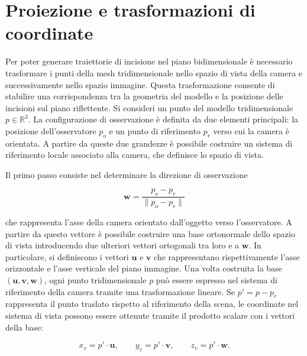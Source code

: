 \documentclass[a4paper,11pt,titlepage,twoside]{book}
\newcommand{\1}{\mathbf{1}}
\numberwithin{equation}{chapter}
\theoremstyle{plain}
\theoremstyle{definition}
\begin{document}
	\section{Proiezione e trasformazioni di coordinate}
	
	Per poter generare traiettorie di incisione nel piano bidimensionale è necessario trasformare i punti della mesh tridimensionale nello spazio di vista della camera e successivamente nello spazio immagine. Questa trasformazione consente di stabilire una corrispondenza tra la geometria del modello e la posizione delle incisioni sul piano riflettente.
	Si consideri un punto del modello tridimensionale \(p \in \mathbb{R}^3\). La configurazione di osservazione è definita da due elementi principali: la posizione dell’osservatore \(p_o\) e un punto di riferimento \(p_r\) verso cui la camera è orientata. A partire da queste due grandezze è possibile costruire un sistema di riferimento locale associato alla camera, che definisce lo spazio di vista.
	
	Il primo passo consiste nel determinare la direzione di osservazione
	
	\[
	\mathbf{w} = \frac{p_o - p_r}{\|p_o - p_r\|}
	\]
	
	che rappresenta l’asse della camera orientato dall’oggetto verso l’osservatore. A partire da questo vettore è possibile costruire una base ortonormale dello spazio di vista introducendo due ulteriori vettori ortogonali tra loro e a \(\mathbf{w}\). In particolare, si definiscono i vettori \(\mathbf{u}\) e \(\mathbf{v}\) che rappresentano rispettivamente l’asse orizzontale e l’asse verticale del piano immagine.
	Una volta costruita la base \((\mathbf{u}, \mathbf{v}, \mathbf{w})\), ogni punto tridimensionale \(p\) può essere espresso nel sistema di riferimento della camera tramite una trasformazione lineare. Se \(p' = p - p_r\) rappresenta il punto traslato rispetto al riferimento della scena, le coordinate nel sistema di vista possono essere ottenute tramite il prodotto scalare con i vettori della base:
	
	\[
	x_v = p' \cdot \mathbf{u}, \qquad
	y_v = p' \cdot \mathbf{v}, \qquad
	z_v = p' \cdot \mathbf{w}.
	\]
	
\end{document}
